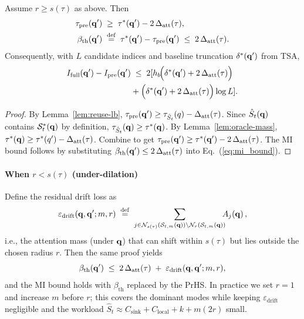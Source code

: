 \begin{proposition}
\label{prop:cis-beta}
Assume $r\ge s(\tau)$ as above. Then
\begin{equation}
\begin{aligned}
\tau_{\mathrm{pre}}(\mathbf{q}') &\;\ge\; \tau^\ast(\mathbf{q}') - 2\,\Delta_{\mathrm{att}}(\tau),
 \\
\beta_{\mathrm{th}}(\mathbf{q}') &\;\stackrel{\mathrm{def}}{=}\; \tau^\ast(\mathbf{q}')-\tau_{\mathrm{pre}}(\mathbf{q}') \;\le\; 2\,\Delta_{\mathrm{att}}(\tau).
\end{aligned}
\end{equation}
Consequently, with $L$ candidate indices and baseline truncation $\delta^\ast(\mathbf{q}')$ from TSA,
\begin{equation}
\begin{aligned}
I_{\mathrm{full}}(\mathbf{q}')-I_{\mathrm{pre}}(\mathbf{q}')
&\;\le\; 2[h_b\!\Big(\delta^\ast(\mathbf{q}')+2\,\Delta_{\mathrm{att}}(\tau)\Big) \\
&+ \Big(\delta^\ast(\mathbf{q}')+2\,\Delta_{\mathrm{att}}(\tau)\Big)\log L].
\end{aligned}
\end{equation}

\end{proposition}

\begin{proof}
By Lemma~\ref{lem:reuse-lb}, $\tau_{\mathrm{pre}}(\mathbf{q}') \ge \tau_{\hat S_t}(q)-\Delta_{\mathrm{att}}(\tau)$.
Since $\hat S_t(\mathbf{q})$ contains $\mathcal{S}_t^\ast(\mathbf{q})$ by definition, $\tau_{\hat S_t}(\mathbf{q})\ge \tau^\ast(\mathbf{q})$.
By Lemma~\ref{lem:oracle-mass}, $\tau^\ast(\mathbf{q})\ge \tau^\ast(q')-\Delta_{\mathrm{att}}(\tau)$.
Combine to get $\tau_{\mathrm{pre}}(\mathbf{q}') \ge \tau^\ast(\mathbf{q}')-2\,\Delta_{\mathrm{att}}(\tau)$.
The MI bound follows by substituting $\beta_{\mathrm{th}}(\mathbf{q}')\le 2\,\Delta_{\mathrm{att}}(\tau)$ into Eq.~(\ref{eq:mi_bound}).
\end{proof}

\paragraph{When $r<s(\tau)$ (under-dilation)}
Define the residual drift loss as
\[
\varepsilon_{\mathrm{drift}}(\bq,\bq';m,r)
\;\stackrel{\mathrm{def}}{=}\;
\sum_{j\in \mathcal{N}_{s(\tau)}(\mathcal{S}_{t,m}(\bq))\setminus \mathcal{N}_{r}(\mathcal{S}_{t,m}(\bq))}
\hspace{-2mm}A_j(\bq)\,,
\]
i.e., the attention mass (under $\mathbf{q}$) that can shift within $s(\tau)$ but lies outside the chosen radius $r$.
Then the same proof yields
\[
\beta_{\mathrm{th}}(\mathbf{q}') \;\le\; 2\,\Delta_{\mathrm{att}}(\tau) \;+\; \varepsilon_{\mathrm{drift}}(\mathbf{q},\mathbf{q}';m,r),
\]
and the MI bound holds with $\beta_{\mathrm{th}}$ replaced by the PrHS.
In practice we set $r\!=\!1$ and increase $m$ before $r$; this covers the dominant modes while keeping
$\varepsilon_{\mathrm{drift}}$ negligible and the workload
$\hat S_t\!\approx C_{\mathrm{sink}}+C_{\mathrm{local}}+k+m(2r)$ small.


